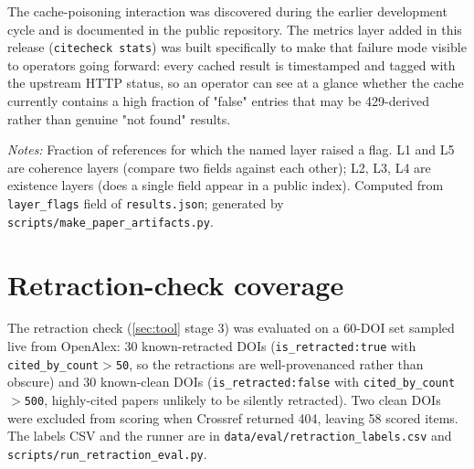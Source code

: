 \documentclass[12pt]{article}
\begin{document}
The cache-poisoning interaction was discovered during the earlier development cycle and is documented in the public repository. The metrics layer added in this release (\texttt{citecheck stats}) was built specifically to make that failure mode visible to operators going forward: every cached result is timestamped and tagged with the upstream HTTP status, so an operator can see at a glance whether the cache currently contains a high fraction of "false" entries that may be 429-derived rather than genuine "not found" results.

\begin{table}[htbp]
\centering
\caption{Per-layer firing rate by ground-truth class}
\label{tab:per-layer-firing}
\begin{threeparttable}

\begin{tablenotes}\small
\item \textit{Notes:} Fraction of references for which the named layer raised a flag. L1 and L5 are coherence layers (compare two fields against each other); L2, L3, L4 are existence layers (does a single field appear in a public index). Computed from \texttt{layer\_flags} field of \texttt{results.json}; generated by \texttt{scripts/make\_paper\_artifacts.py}.
\end{tablenotes}
\end{threeparttable}
\end{table}

\section{Retraction-check coverage}\label{app:retraction}

The retraction check (\cref{sec:tool} stage 3) was evaluated on a 60-DOI set sampled live from OpenAlex: 30 known-retracted DOIs (\texttt{is\_retracted:true} with \texttt{cited\_by\_count$>$50}, so the retractions are well-provenanced rather than obscure) and 30 known-clean DOIs (\texttt{is\_retracted:false} with \texttt{cited\_by\_count$>$500}, highly-cited papers unlikely to be silently retracted). Two clean DOIs were excluded from scoring when Crossref returned 404, leaving 58 scored items. The labels CSV and the runner are in \texttt{data/eval/retraction\_labels.csv} and \texttt{scripts/run\_retraction\_eval.py}.
\end{document}

